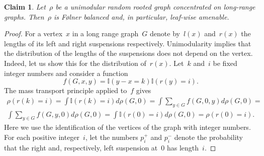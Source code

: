 \documentclass[english]{article}
\newtheorem{claim}[lemma]{Claim}
\theoremstyle{definition}
\begin{document}
\begin{claim}
    Let~$\rho$ be a unimodular random rooted graph concentrated on long-range graphs. Then~$\rho$ is {F\o lner} balanced and, in particular, leaf-wise amenable. 
\end{claim}
\begin{proof}
    For a vertex~$x$ in a long range graph~$G$ denote by~$l(x)$ and~$r(x)$ the lengths of its left and right suspensions respectively. Unimodularity implies that the distribution of the lengths of the suspensions does not depend on the vertex. Indeed, let us show this for the distribution of~$r(x)$. Let~$k$ and~$i$ be fixed integer numbers and consider a function 
    $$
    f(G, x, y) = \mathbb{I}(y - x = k) \mathbb{I}(r(y) = i).
    $$
    The mass transport principle applied to~$f$ gives 
    \begin{multline}
        \rho(r(k) = i) = \int \mathbb{I}(r(k) = i) d \rho (G, 0) = \int \sum_{y \in G} f(G, 0, y) d \rho (G, 0) = \\
        \int \sum_{y \in G} f(G, y, 0) d \rho (G, 0) = \int \mathbb{I}(r(0) = i) d \rho (G, 0) = \rho(r(0) = i).
    \end{multline}
    Here we use the identification of the vertices of the graph with integer numbers. For each positive integer~$i$, let the numbers $p_i^+$ and $p_i^-$  denote the probability that the right and, respectively, left suspension at~$0$ has length~$i$. 
    

\end{proof}
\end{document}
